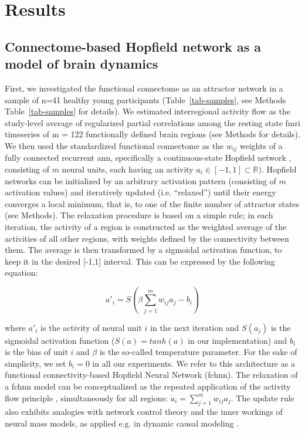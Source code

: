 \documentclass{article}
\begin{document}
\section{Results}

\subsection{Connectome-based Hopfield network as a model of brain dynamics}

First, we investigated the functional connectome as an attractor network in a sample of n=41 healthy young
participants (Table~\ref{tab-samples}, see Methods Table~\ref{tab-samples} for details). We estimated interregional activity flow \citep{cole2016activity, ito2017cognitive} as the study-level average of regularized partial correlations among the resting state \acrshort{fmri} timeseries of m = 122
functionally defined brain regions (see Methods for details). We then used the standardized functional connectome as the $w_{ij}$  weights of a fully connected recurrent \acrshort{ann}, specifically a continuous-state Hopfield network \citep{hopfield1982neural, koiran1994dynamics}, consisting of $m$ neural units, each having an activity $a_i \in [ -1,1] \subset \mathbb{R})$. Hopfield networks can be initialized by an arbitrary activation pattern (consisting of $m$ activation values) and iteratively updated (i.e. ``relaxed'') until their energy converges a local minimum, that is, to one of the finite number of attractor states (see Methods). The relaxation procedure is based on a simple rule; in each iteration, the activity of a region is constructed as the weighted average of the activities of all other regions, with weights defined by the connectivity between them. The average is then transformed by a sigmoidal activation function, to keep it in the desired [-1,1] interval.
This can be expressed by the following equation:

\begin{equation}
\label{hopfield-update}
{a'}_i = S(\beta \sum_{j=1}^m w_{ij}a_j - b_i)
\end{equation}

where $a'_i$ is the activity of neural unit $i$ in the next iteration and $S(a_j)$ is the sigmoidal activation
function ($S(a) = tanh(a)$ in our implementation) and $b_i$ is the bias of unit $i$ and $\beta$ is the so-called temperature parameter. For the sake of simplicity, we set $b_i=0$ in all our experiments. We refer to this architecture as a functional connectivity-based Hopfield Neural Network (\acrshort{fchnn}).
The relaxation of a \acrshort{fchnn} model can be conceptualized as the repeated application of the activity flow principle \citep{cole2016activity, ito2017cognitive} , simultaneously for all regions: $\dot{a}_i = \sum_{j=1}^m w_{ij}a_j$. The update rule also exhibits analogies with network control theory \citep{gu2015controllability} and the inner workings of neural mass models, as applied e.g. in dynamic causal modeling \citep{daunizeau2012stochastic}.
\end{document}
